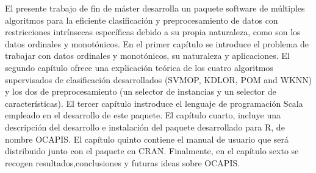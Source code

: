 
El presente trabajo de fin de máster desarrolla un paquete software de múltiples algoritmos para la eficiente clasificación y preprocesamiento de datos con restricciones intrínsecas específicas debido a su propia naturaleza, como son los datos ordinales y monotónicos. \newline
En el primer capítulo se introduce el problema de trabajar con datos ordinales y monotónicos, su naturaleza y aplicaciones. El segundo capítulo ofrece una explicación teórica de  los cuatro algoritmos supervisados de clasificación desarrollados (SVMOP, KDLOR, POM and WKNN) y los dos de preprocesamiento (un  selector de instancias y un selector de características). El tercer capítulo instroduce el lenguaje de programación Scala empleado en el desarrollo de este paquete. El capítulo cuarto, incluye una descripción del desarrollo e instalación del paquete desarrollado para R, de nombre OCAPIS. El capítulo quinto contiene el manual de usuario que será distribuido junto con el paquete en CRAN. Finalmente, en el capítulo sexto se recogen resultados,conclusiones y futuras ideas sobre OCAPIS.
\newline \newline
{}
